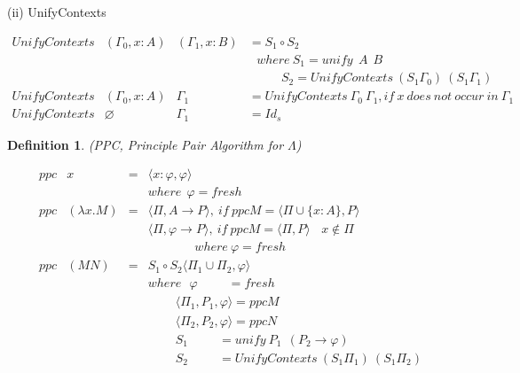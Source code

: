\documentclass[a4paper,11pt,twoside]{report}
\newtheorem{def1}{\textbf{Definition}}[chapter]
\begin{document}
\noindent (ii) UnifyContexts

\begin{equation*}
\begin{array}{llll}
UnifyContexts & (\Gamma _0,x:A) & (\Gamma _1,x:B) & = S_1\circ S_2\\
&&&\ \ \ where\ S_1 = unify\ \ A\ \ B\\
&&&\ \ \ \ \ \ \ \ \ \ \ \ S_2 = UnifyContexts\ (S_1\Gamma _0)\ (S_1\Gamma _1)\\
UnifyContexts & (\Gamma _0,x:A) & \Gamma _1 & = UnifyContexts\ \Gamma _0\ \Gamma _1, if\ x\ does\ not\ occur\ in\ \Gamma _1\\
UnifyContexts & \varnothing & \Gamma _1 & =  Id_s
\end{array}
\end{equation*}



\begin{def1}
\normalfont (PPC, Principle Pair Algorithm for $\Lambda$)
\end{def1}

\begin{equation*}
\begin{array}{llll}
ppc & x & = & \langle x:\varphi,\varphi \rangle\\
&&& where\ \ \varphi=fresh\\
ppc & (\lambda x.M) & = & \langle \Pi,A \rightarrow P \rangle,\ if\ ppcM=\langle \Pi \cup \{x:A\},P \rangle\\
&&& \langle \Pi,\varphi \rightarrow P \rangle,\ if\ ppcM=\langle \Pi ,P \rangle\ \ \ \ x\not\in \Pi\\
&&&\ \ \ \ \ \ \ \ \ \ \ \ \ \ \ \ \ where\ \varphi=fresh\\
ppc & (MN) & = & S_1\circ S_2\langle \Pi _1\cup \Pi _2,\varphi \rangle\\
&&& where\ \ \ \varphi \ \ \ \ \ \ \ \ \ \ \ = fresh\\
&&& \ \ \ \ \ \ \ \ \ \ \langle \Pi _1,P_1,\varphi \rangle = ppcM\\
&&& \ \ \ \ \ \ \ \ \ \ \langle \Pi _2,P_2,\varphi \rangle = ppcN\\
&&& \ \ \ \ \ \ \ \ \ \ S_1 \ \ \ \ \ \ \ \ \ \ \ = unify\ P_1\ \ (P_2 \rightarrow \varphi)\\
&&& \ \ \ \ \ \ \ \ \ \ S_2 \ \ \ \ \ \ \ \ \ \ \ = UnifyContexts\ (S_1\Pi _1)\ (S_1\Pi _2)\\
\end{array}
\end{equation*}
\end{document}
